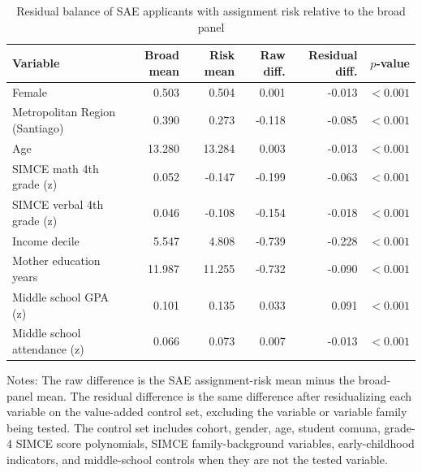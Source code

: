 \begin{table}[!htbp]
\centering
\caption{Residual balance of SAE applicants with assignment risk relative to the broad panel}
\label{tab:residual-balance-sae-risk}
\small
\setlength{\tabcolsep}{4pt}
\begin{tabular}{lrrrrr}
\toprule
Variable & Broad mean & Risk mean & Raw diff. & Residual diff. & $p$-value \\
\midrule
Female & 0.503 & 0.504 & 0.001 & -0.013 & $<0.001$ \\
Metropolitan Region (Santiago) & 0.390 & 0.273 & -0.118 & -0.085 & $<0.001$ \\
Age & 13.280 & 13.284 & 0.003 & -0.013 & $<0.001$ \\
SIMCE math 4th grade (z) & 0.052 & -0.147 & -0.199 & -0.063 & $<0.001$ \\
SIMCE verbal 4th grade (z) & 0.046 & -0.108 & -0.154 & -0.018 & $<0.001$ \\
Income decile & 5.547 & 4.808 & -0.739 & -0.228 & $<0.001$ \\
Mother education years & 11.987 & 11.255 & -0.732 & -0.090 & $<0.001$ \\
Middle school GPA (z) & 0.101 & 0.135 & 0.033 & 0.091 & $<0.001$ \\
Middle school attendance (z) & 0.066 & 0.073 & 0.007 & -0.013 & $<0.001$ \\
\bottomrule
\end{tabular}
\par\medskip
\footnotesize
\begin{minipage}{0.95\textwidth}
Notes: The raw difference is the SAE assignment-risk mean minus the broad-panel mean. The residual difference is the same difference after residualizing each variable on the value-added control set, excluding the variable or variable family being tested. The control set includes cohort, gender, age, student comuna, grade-4 SIMCE score polynomials, SIMCE family-background variables, early-childhood indicators, and middle-school controls when they are not the tested variable.
\end{minipage}
\end{table}
